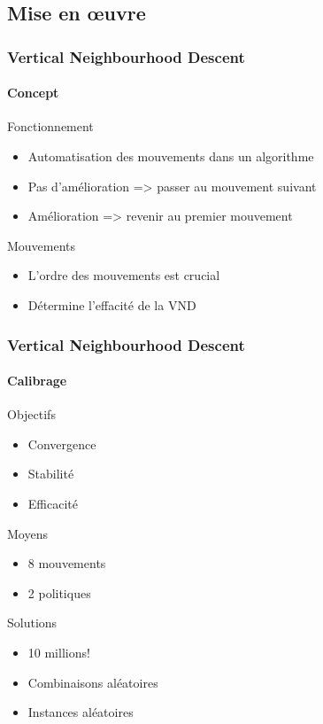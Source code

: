 \subsection{Mise en \oe uvre}
\begin{frame}
	\frametitle{Vertical Neighbourhood Descent}
	\framesubtitle{Concept}
	\begin{block}{Fonctionnement}
		\begin{itemize}
			\item Automatisation des mouvements dans un algorithme
			\item Pas d'amélioration => passer au mouvement suivant
			\item Amélioration => revenir au premier mouvement
		\end{itemize}
	\end{block}
	\vspace*{1em}
	\begin{block}{Mouvements}
		\begin{itemize}
			\item L'ordre des mouvements est crucial
			\item Détermine l'effacité de la VND
		\end{itemize}
	\end{block}
\end{frame}
\begin{frame}
	\frametitle{Vertical Neighbourhood Descent}
	\framesubtitle{Calibrage}
	\begin{alertblock}{Objectifs}
		\begin{itemize}
			\item Convergence
			\item Stabilité
			\item Efficacité
		\end{itemize}
	\end{alertblock}
	\begin{block}{Moyens}
		\begin{itemize}
			\item 8 mouvements
			\item 2 politiques
		\end{itemize}
	\end{block}
	\begin{exampleblock}{Solutions}
		\begin{itemize}
			\item 10 millions!
			\item Combinaisons aléatoires
			\item Instances aléatoires
		\end{itemize}
	\end{exampleblock}
\end{frame}
